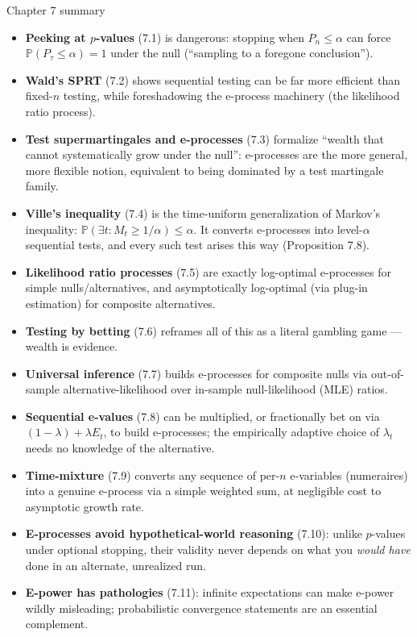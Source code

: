 \documentclass[aspectratio=169,10pt]{beamer}
\begin{document}
\begin{frame}[allowframebreaks]{Chapter 7 summary}

\begin{itemize}
\item \textbf{Peeking at $p$-values} (7.1) is dangerous: stopping when $P_n\le\alpha$ can force
$\mathbb P(P_\tau\le\alpha)=1$ under the null (``sampling to a foregone conclusion'').
\item \textbf{Wald's SPRT} (7.2) shows sequential testing can be far more efficient than fixed-$n$ testing, while
foreshadowing the e-process machinery (the likelihood ratio process).
\item \textbf{Test supermartingales and e-processes} (7.3) formalize ``wealth that cannot systematically grow under
the null'': e-processes are the more general, more flexible notion, equivalent to being dominated by a test
martingale family.
\item \textbf{Ville's inequality} (7.4) is the time-uniform generalization of Markov's inequality: $\mathbb
P(\exists t: M_t\ge1/\alpha)\le\alpha$. It converts e-processes into level-$\alpha$ sequential tests, and every
such test arises this way (Proposition 7.8).
\item \textbf{Likelihood ratio processes} (7.5) are exactly log-optimal e-processes for simple nulls/alternatives,
and asymptotically log-optimal (via plug-in estimation) for composite alternatives.
\item \textbf{Testing by betting} (7.6) reframes all of this as a literal gambling game --- wealth is evidence.
\item \textbf{Universal inference} (7.7) builds e-processes for composite nulls via out-of-sample
alternative-likelihood over in-sample null-likelihood (MLE) ratios.
\item \textbf{Sequential e-values} (7.8) can be multiplied, or fractionally bet on via $(1-\lambda)+\lambda E_t$,
to build e-processes; the empirically adaptive choice of $\lambda_t$ needs no knowledge of the alternative.
\item \textbf{Time-mixture} (7.9) converts any sequence of per-$n$ e-variables (numeraires) into a genuine
e-process via a simple weighted sum, at negligible cost to asymptotic growth rate.
\item \textbf{E-processes avoid hypothetical-world reasoning} (7.10): unlike $p$-values under optional stopping,
their validity never depends on what you \emph{would have} done in an alternate, unrealized run.
\item \textbf{E-power has pathologies} (7.11): infinite expectations can make e-power wildly misleading; probabilistic
convergence statements are an essential complement.
\end{itemize}

\end{frame}
\end{document}
